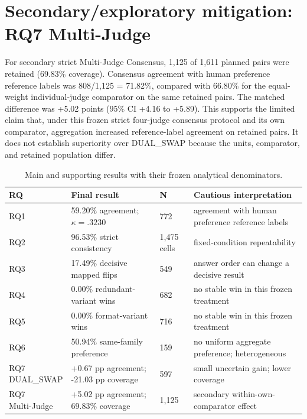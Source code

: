 \section{Secondary/exploratory mitigation: RQ7 Multi-Judge}

For secondary strict Multi-Judge Consensus, 1,125 of 1,611 planned pairs were retained (69.83\% coverage). Consensus agreement with human preference reference labels was 808/1,125 = 71.82\%, compared with 66.80\% for the equal-weight individual-judge comparator on the same retained pairs. The matched difference was +5.02 points (95\% CI +4.16 to +5.89). This supports the limited claim that, under this frozen strict four-judge consensus protocol and its own comparator, aggregation increased reference-label agreement on retained pairs. It does not establish superiority over DUAL\_SWAP because the units, comparator, and retained population differ.

\begin{table}[H]
\centering
\caption{Main and supporting results with their frozen analytical denominators.}
\label{tab:primary-results}
\small
\begin{tabularx}{\textwidth}{@{}p{}p{}p{}X@{}}
\toprule
RQ & Final result & N & Cautious interpretation\\
\midrule
RQ1 & 59.20\% agreement; $\kappa=.3230$ & 772 & agreement with human preference reference labels\\
RQ2 & 96.53\% strict consistency & 1,475 cells & fixed-condition repeatability\\
RQ3 & 17.49\% decisive mapped flips & 549 & answer order can change a decisive result\\
RQ4 & 0.00\% redundant-variant wins & 682 & no stable win in this frozen treatment\\
RQ5 & 0.00\% format-variant wins & 716 & no stable win in this frozen treatment\\
RQ6 & 50.94\% same-family preference & 159 & no uniform aggregate preference; heterogeneous\\
\shortstack[l]{RQ7\\DUAL\_SWAP} & +0.67 pp agreement; -21.03 pp coverage & 597 & small uncertain gain; lower coverage\\
\shortstack[l]{RQ7\\Multi-Judge} & +5.02 pp agreement; 69.83\% coverage & 1,125 & secondary within-own-comparator effect\\
\bottomrule
\end{tabularx}
\end{table}
